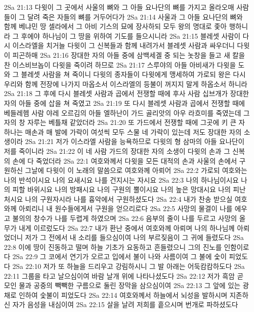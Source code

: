 2Sa 21:13  다윗이 그 곳에서 사울의 뼈와 그 아들 요나단의 뼈를 가지고 올라오매 사람들이 그 달려 죽은 자들의 뼈를 거두어다가
2Sa 21:14  사울과 그 아들 요나단의 뼈와 함께 베냐민 땅 셀라에서 그 아비 기스의 묘에 장사하되 모두 왕의 명대로 좇아 행하니라 그 후에야 하나님이 그 땅을 위하여 기도를 들으시니라
2Sa 21:15  블레셋 사람이 다시 이스라엘을 치거늘 다윗이 그 신복들과 함께 내려가서 블레셋 사람과 싸우더니 다윗이 피곤하매
2Sa 21:16  장대한 자의 아들 중에 삼백세겔 중 되는 놋창을 들고 새 칼을 찬 이스비브놉이 다윗을 죽이려 하므로
2Sa 21:17  스루야의 아들 아비새가 다윗을 도와 그 블레셋 사람을 쳐 죽이니 다윗의 종자들이 다윗에게 맹세하여 가로되 왕은 다시 우리와 함께 전장에 나가지 마옵소서 이스라엘의 등불이 꺼지지 말게 하옵소서 하니라
2Sa 21:18  그 후에 다시 블레셋 사람과 곱에서 전쟁할 때에 후사 사람 십브개가 장대한 자의 아들 중에 삽을 쳐 죽였고
2Sa 21:19  또 다시 블레셋 사람과 곱에서 전쟁할 때에 베들레헴 사람 야레 오르김의 아들 엘하난이 가드 골리앗의 아우 라흐미를 죽였는데 그 자의 창 자루는 베틀채 같았더라
2Sa 21:20  또 가드에서 전쟁할 때에 그곳에 키 큰 자 하나는 매손과 매 발에 가락이 여섯씩 모두 스물 네 가락이 있는데 저도 장대한 자의 소생이라
2Sa 21:21  저가 이스라엘 사람을 능욕하므로 다윗의 형 삼마의 아들 요나단이 저를 죽이니라
2Sa 21:22  이 네 사람 가드의 장대한 자의 소생이 다윗의 손과 그 신복의 손에 다 죽었더라
2Sa 22:1  여호와께서 다윗을 모든 대적의 손과 사울의 손에서 구원하신 그날에 다윗이 이 노래의 말씀으로 여호와께 아뢰어
2Sa 22:2  가로되 여호와는 나의 반석이시요 나의 요새시요 나를 건지시는 자시요
2Sa 22:3  나의 하나님이시요 나의 피할 바위시요 나의 방패시요 나의 구원의 뿔이시요 나의 높은 망대시요 나의 피난처시요 나의 구원자시라 나를 흉악에서 구원하셨도다
2Sa 22:4  내가 찬송 받으실 여호와께 아뢰리니 내 원수들에게서 구원을 얻으리로다
2Sa 22:5  사망의 물결이 나를 에우고 불의의 창수가 나를 두렵게 하였으며
2Sa 22:6  음부의 줄이 나를 두르고 사망의 올무가 내게 이르렀도다
2Sa 22:7  내가 환난 중에서 여호와께 아뢰며 나의 하나님께 아뢰었더니 저가 그 전에서 내 소리를 들으심이여 나의 부르짖음이 그 귀에 들렸도다
2Sa 22:8  이에 땅이 진동하고 떨며 하늘 기초가 요동하고 흔들렸으니 그의 진노를 인함이로다
2Sa 22:9  그 코에서 연기가 오르고 입에서 불이 나와 사름이여 그 불에 숯이 피었도다
2Sa 22:10  저가 또 하늘을 드리우고 강림하시니 그 발 아래는 어둑캄캄하도다
2Sa 22:11  그룹을 타고 날으심이여 바람 날개 위에 나타나셨도다
2Sa 22:12  저가 흑암 곧 모인 물과 공중의 빽빽한 구름으로 둘린 장막을 삼으심이여
2Sa 22:13  그 앞에 있는 광채로 인하여 숯불이 피었도다
2Sa 22:14  여호와께서 하늘에서 뇌성을 발하시며 지존하신 자가 음성을 내심이여
2Sa 22:15  살을 날려 저희를 흩으시며 번개로 파하셨도다
